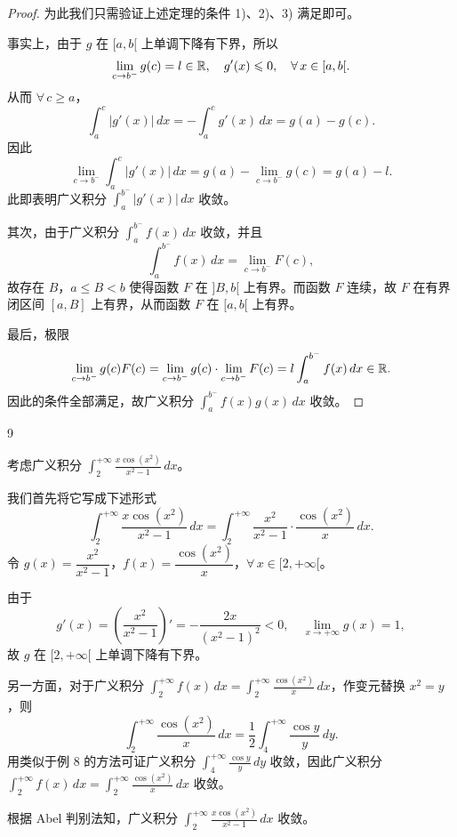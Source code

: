 \begin{proof}

为此我们只需验证上述定理的条件 1)、2)、3) 满足即可。

事实上，由于 $g$ 在 $[a,b[$ 上单调下降有下界，所以
\[\lim_{c\to b^-}g(c)=l\in\mathbb{R},\quad g'(x)\leqslant0,\quad\forall\,x\in[a,b[.\]
从而 $\forall\,c\geqslant a$，
\[\int_a^c|g'(x)|\,dx=-\int_a^cg'(x)\,dx=g(a)-g(c).\]
因此
\[\lim_{c\to b^-}\int_a^c|g'(x)|\,dx=g(a)-\lim_{c\to b^-}g(c)=g(a)-l.\]
此即表明广义积分 $\displaystyle\int_a^{b^-}|g'(x)|\,dx$ 收敛。

其次，由于广义积分 $\displaystyle\int_a^{b^-}f(x)\,dx$ 收敛，并且
\[\int_a^{b^-}f(x)\,dx=\lim_{c\to b^-}F(c),\]
故存在 $B$，$a\leqslant B<b$ 使得函数 $F$ 在 $]B,b[$ 上有界。而函数 $F$ 连续，故 $F$ 在有界闭区间 $[a,B]$ 上有界，从而函数 $F$ 在 $[a,b[$ 上有界。

最后，极限
\[\lim_{c\to b^-}g(c)F(c)=\lim_{c\to b^-}g(c)\cdot\lim_{c\to b^-}F(c)=l\int_a^{b^-}f(x)\,dx\in\mathbb{R}.\]
因此的条件全部满足，故广义积分 $\displaystyle\int_a^{b^-}f(x)g(x)\,dx$ 收敛。

\end{proof}

\begin{sourceexample}{9}

考虑广义积分 $\displaystyle\int_2^{+\infty}\frac{x\cos(x^2)}{x^2-1}\,dx$。

我们首先将它写成下述形式
\[\int_2^{+\infty}\frac{x\cos(x^2)}{x^2-1}\,dx=\int_2^{+\infty}\frac{x^2}{x^2-1}\cdot\frac{\cos(x^2)}{x}\,dx.\]
令 $g(x)=\dfrac{x^2}{x^2-1}$，$f(x)=\dfrac{\cos(x^2)}{x}$，$\forall\,x\in[2,+\infty[$。

由于
\[g'(x)=\left(\frac{x^2}{x^2-1}\right)'=-\frac{2x}{(x^2-1)^2}<0,\quad\lim_{x\to+\infty}g(x)=1,\]
故 $g$ 在 $[2,+\infty[$ 上单调下降有下界。

另一方面，对于广义积分 $\displaystyle\int_2^{+\infty}f(x)\,dx=\int_2^{+\infty}\frac{\cos(x^2)}{x}\,dx$，作变元替换 $x^2=y$，则
\[\int_2^{+\infty}\frac{\cos(x^2)}{x}\,dx=\frac{1}{2}\int_4^{+\infty}\frac{\cos y}{y}\,dy.\]
用类似于例 8 的方法可证广义积分 $\displaystyle\int_4^{+\infty}\frac{\cos y}{y}\,dy$ 收敛，因此广义积分 $\displaystyle\int_2^{+\infty}f(x)\,dx=\int_2^{+\infty}\frac{\cos(x^2)}{x}\,dx$ 收敛。

根据 Abel 判别法知，广义积分 $\displaystyle\int_2^{+\infty}\frac{x\cos(x^2)}{x^2-1}\,dx$ 收敛。

\end{sourceexample}

